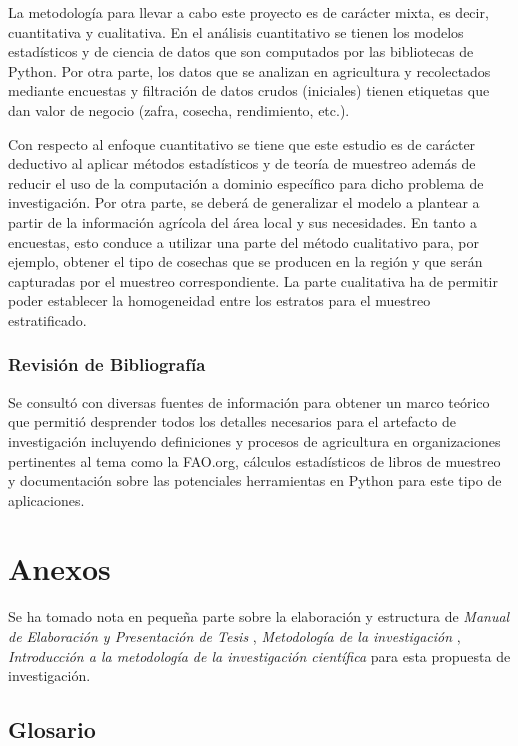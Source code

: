 \documentclass{report}
\begin{document}
La metodología para llevar a cabo este proyecto es de carácter mixta, es decir, cuantitativa y cualitativa. En el análisis cuantitativo se tienen los modelos estadísticos y de ciencia de datos que son computados por las bibliotecas de Python. Por otra parte, los datos que se analizan en agricultura y recolectados mediante encuestas y filtración de datos crudos (iniciales) tienen etiquetas que dan valor de negocio (zafra, cosecha, rendimiento, etc.).

\bigbreak

Con respecto al enfoque cuantitativo se tiene que este estudio es de carácter deductivo al aplicar métodos estadísticos y de teoría de muestreo además de reducir el uso de la computación a dominio específico para dicho problema de investigación. Por otra parte, se deberá de generalizar el modelo a plantear a partir de la información agrícola del área local y sus necesidades. En tanto a encuestas, esto conduce a utilizar una parte del método cualitativo para, por ejemplo, obtener el tipo de cosechas que se producen en la región y que serán capturadas por el muestreo correspondiente. La parte cualitativa ha de permitir poder establecer la homogeneidad entre los estratos para el muestreo estratificado.

\subsection{Revisión de Bibliografía}

Se consultó con diversas fuentes de información para obtener un marco teórico que permitió desprender todos los detalles necesarios para el artefacto de investigación incluyendo definiciones y procesos de agricultura en organizaciones pertinentes al tema como la FAO.org, cálculos estadísticos de libros de muestreo y documentación sobre las potenciales herramientas en Python para este tipo de aplicaciones.

\chapter{Anexos}

Se ha tomado nota en pequeña parte sobre la elaboración y estructura de \textit{Manual de Elaboración y Presentación de Tesis} \cite{universidad-san-carlos-2016}, \textit{Metodología de la investigación} \cite{collado-2014}, \textit{Introducción a la metodología de la investigación científica} \cite{cabezas-2018} para esta propuesta de investigación.

\section{Glosario}
\end{document}
